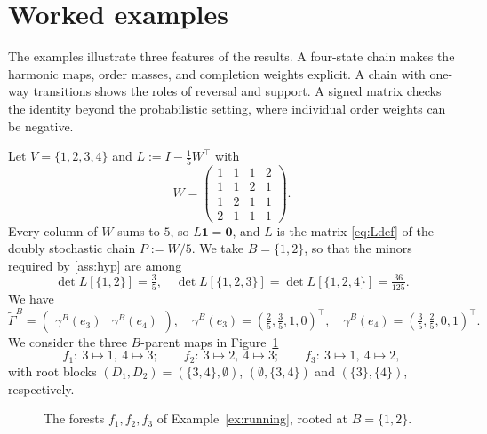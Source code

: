 \documentclass[onefignum,onetabnum,nohypdvips]{siamart250211}
\numberwithin{theorem}{section}
\numberwithin{equation}{section}
\newcommand{\one}{\mathbf{1}}
\newcommand{\zero}{\mathbf{0}}
\begin{document}
\appendix

\section{Worked examples}\label{sec:app-examples}

The examples illustrate three features of the results. A four-state
chain makes the harmonic maps, order masses, and completion weights
explicit. A chain with one-way transitions shows the roles of
reversal and support. A signed matrix checks the identity beyond
the probabilistic setting, where individual order weights can be
negative.

\begin{example}\label{ex:running}
Let $V=\{1,2,3,4\}$ and $L:=I-\tfrac15W^{\top}$ with
\[
W=\begin{pmatrix}1&1&1&2\\1&1&2&1\\1&2&1&1\\2&1&1&1\end{pmatrix}.
\]
Every column of $W$ sums to $5$, so $L\one=\zero$, and $L$ is the
matrix \eqref{eq:Ldef} of the doubly stochastic chain $P:=W/5$. We take
$B=\{1,2\}$, so that the minors required by \cref{ass:hyp} are among
\[
\det L[\{1,2\}]=\tfrac35,\quad
\det L[\{1,2,3\}]=\det L[\{1,2,4\}]=\tfrac{36}{125}.
\] 
We have
\[
\tilde\Gamma^B=\begin{pmatrix}
\gamma^B(e_3) &\gamma^B(e_4)
\end{pmatrix},\quad
\gamma^{B}(e_3)=(\tfrac25,\tfrac35,1,0)^{\top},\quad
\gamma^{B}(e_4)=(\tfrac35,\tfrac25,0,1)^{\top}.
\]
We consider the three $B$-parent maps in Figure~\ref{fig:sm-running}
\[
f_1:\ 3\mapsto1,\ 4\mapsto3;\qquad
f_2:\ 3\mapsto2,\ 4\mapsto3;\qquad
f_3:\ 3\mapsto1,\ 4\mapsto2,
\]
with root blocks $(D_1,D_2)=(\{3,4\},\emptyset)$,
$(\emptyset,\{3,4\})$ and $(\{3\},\{4\})$, respectively. 

\begin{figure}[H]
\centering
{}
\caption{The forests $f_1,f_2,f_3$ of Example~\ref{ex:running}, rooted at
$B=\{1,2\}$.}
\label{fig:sm-running}
\end{figure}


\end{example}
\end{document}
